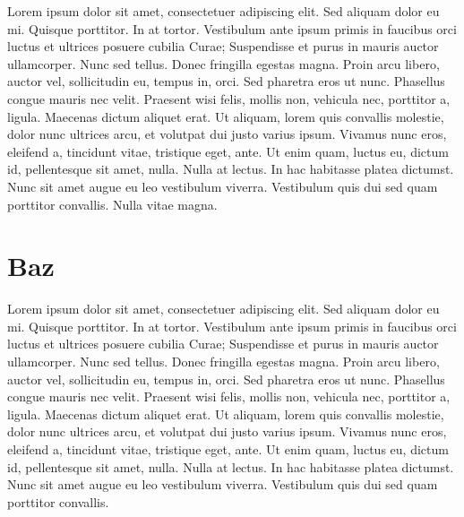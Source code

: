 Lorem ipsum dolor sit amet, consectetuer adipiscing elit. Sed
aliquam dolor eu mi. Quisque porttitor. In at tortor. Vestibulum
ante ipsum primis in faucibus orci luctus et ultrices posuere
cubilia Curae; Suspendisse et purus in mauris auctor ullamcorper.
Nunc sed tellus. Donec fringilla egestas magna. Proin arcu libero,
auctor vel, sollicitudin eu, tempus in, orci. Sed pharetra eros ut
nunc. Phasellus congue mauris nec velit. Praesent wisi felis, mollis
non, vehicula nec, porttitor a, ligula. Maecenas dictum aliquet
erat. Ut aliquam, lorem quis convallis molestie, dolor nunc ultrices
arcu, et volutpat dui justo varius ipsum. Vivamus nunc eros,
eleifend a, tincidunt vitae, tristique eget, ante. Ut enim quam,
luctus eu, dictum id, pellentesque sit amet, nulla. Nulla at lectus.
In hac habitasse platea dictumst. Nunc sit amet augue eu leo
vestibulum viverra. Vestibulum quis dui sed quam porttitor
convallis. Nulla vitae magna.


\section{Baz}

Lorem ipsum dolor sit amet, consectetuer adipiscing elit. Sed
aliquam dolor eu mi. Quisque porttitor. In at tortor. Vestibulum
ante ipsum primis in faucibus orci luctus et ultrices posuere
cubilia Curae; Suspendisse et purus in mauris auctor ullamcorper.
Nunc sed tellus. Donec fringilla egestas magna. Proin arcu libero,
auctor vel, sollicitudin eu, tempus in, orci. Sed pharetra eros ut
nunc. Phasellus congue mauris nec velit. Praesent wisi felis, mollis
non, vehicula nec, porttitor a, ligula. Maecenas dictum aliquet
erat. Ut aliquam, lorem quis convallis molestie, dolor nunc ultrices
arcu, et volutpat dui justo varius ipsum. Vivamus nunc eros,
eleifend a, tincidunt vitae, tristique eget, ante. Ut enim quam,
luctus eu, dictum id, pellentesque sit amet, nulla. Nulla at lectus.
In hac habitasse platea dictumst. Nunc sit amet augue eu leo
vestibulum viverra. Vestibulum quis dui sed quam porttitor
convallis.


